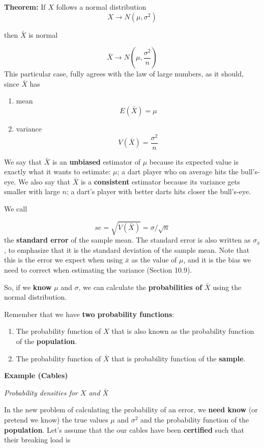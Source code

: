 \documentclass[
]{book}
\begin{document}
\textbf{Theorem:} If \(X\) follows a normal distribution \[X \rightarrow N(\mu, \sigma^2)\]

then \(\bar{X}\) is normal

\[\bar{X} \rightarrow N(\mu, \frac{\sigma^2}{n})\]
This particular case, fully agrees with the law of large numbers, as it should, since \(\bar{X}\) has

\begin{enumerate}
\def\labelenumi{\arabic{enumi})}
\item
  mean
  \[E(\bar{X})=\mu\]
\item
  variance
  \[V(\bar{X})=\frac{\sigma^2}{n}\]
\end{enumerate}

We say that \(\bar{X}\) is an \textbf{unbiased} estimator of \(\mu\) because its expected value is exactly what it wants to estimate: \(\mu\); a dart player who on average hits the bull's-eye. We also say that \(\bar{X}\) is a \textbf{consistent} estimator because its variance gets smaller with large \(n\); a dart's player with better darts hits closer the bull's-eye.

We call

\[se=\sqrt{V(\bar{X})}=\sigma/\sqrt{n}\]
the \textbf{standard error} of the sample mean. The standard error is also written as \(\sigma_{\bar{x}}\), to emphasize that it is the standard deviation of the sample mean. Note that this is the error we expect when using \(\bar{x}\) as the value of \(\mu\), and it is the bias we need to correct when estimating the variance (Section 10.9).

So, if we \textbf{know} \(\mu\) and \(\sigma\), we can calculate the \textbf{probabilities of} \(\bar{X}\) using the normal distribution.

Remember that we have \textbf{two probability functions}:

\begin{enumerate}
\def\labelenumi{\arabic{enumi}.}
\item
  The probability function of \(X\) that is also known as the probability function of the \textbf{population}.
\item
  The probability function of \(\bar{X}\) that is probability function of the \textbf{sample}.
\end{enumerate}

\textbf{Example (Cables)}

\emph{Probability densities for \(X\) and \(\bar{X}\)}

In the new problem of calculating the probability of an error, we \textbf{need know} (or pretend we know) the true values \(\mu\) and \(\sigma^2\) and the probability function of the \textbf{population}. Let's assume that the our cables have been \textbf{certified} such that their breaking load is
\end{document}

